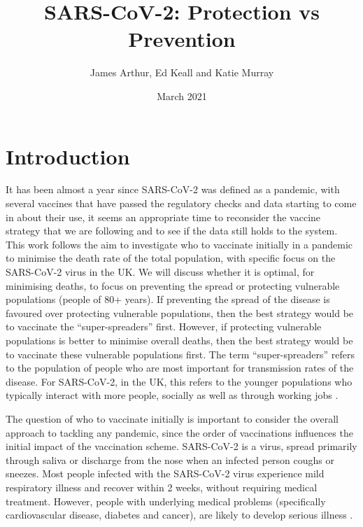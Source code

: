 \documentclass{article}
\title{SARS-CoV-2: Protection vs Prevention}
\author{James Arthur, Ed Keall and Katie Murray}
\date{March 2021}
\begin{document}
\maketitle\newpage
\tableofcontents\listoffigures
\newpage

\newpage 
\section{Introduction}
It has been almost a year since SARS-CoV-2 was defined as a pandemic, with several vaccines that have passed the regulatory checks and data starting to come in about their use, it seems an appropriate time to reconsider the vaccine strategy that we are following and to see if the data still holds to the system. \\

\noindent
This work follows the aim to investigate who to vaccinate initially in a pandemic to minimise the death rate of the total population, with specific focus on the SARS-CoV-2 virus in the UK. We will discuss whether it is optimal, for minimising deaths, to focus on preventing the spread or protecting vulnerable populations (people of 80+ years). If preventing the spread of the disease is favoured over protecting vulnerable populations, then the best strategy would be to vaccinate the ``super-spreaders'' first. However, if protecting vulnerable populations is better to minimise overall deaths, then the best strategy would be to vaccinate these vulnerable populations first. The term ``super-spreaders'' refers to the population of people who are most important for transmission rates of the disease. For SARS-CoV-2, in the UK, this refers to the younger populations who typically interact with more people, socially as well as through working jobs \cite{youngsocial}. \\

\noindent

The question of who to vaccinate initially is important to consider the overall approach to tackling any pandemic, since the order of vaccinations influences the initial impact of the vaccination scheme. SARS-CoV-2 is a virus, spread primarily through saliva or discharge from the nose when an infected person coughs or sneezes. Most people infected with the SARS-CoV-2 virus experience mild respiratory illness and recover within 2 weeks, without requiring medical treatment. However, people with underlying medical problems (specifically cardiovascular disease, diabetes and cancer), are likely to develop serious illness \cite{WHOcorona}.\\
\end{document}
